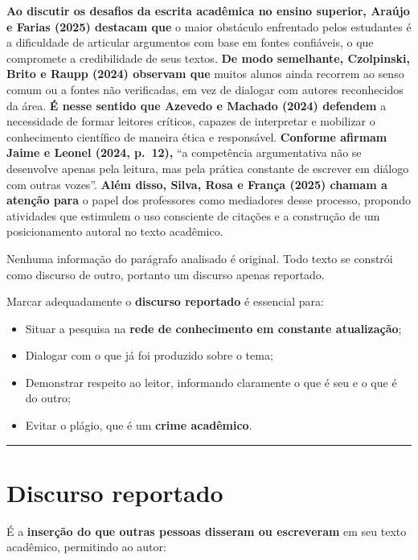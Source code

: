 \documentclass[
  letterpaper,
  DIV=11,
  numbers=noendperiod]{scrreprt}
\providecommand{\tightlist}{%
  \setlength{\itemsep}{0pt}\setlength{\parskip}{0pt}}
\begin{document}
\textbf{Ao discutir os desafios da escrita acadêmica no ensino superior,
Araújo e Farias (2025) destacam que} o maior obstáculo enfrentado pelos
estudantes é a dificuldade de articular argumentos com base em fontes
confiáveis, o que compromete a credibilidade de seus textos. \textbf{De
modo semelhante, Czolpinski, Brito e Raupp (2024) observam que} muitos
alunos ainda recorrem ao senso comum ou a fontes não verificadas, em vez
de dialogar com autores reconhecidos da área. \textbf{É nesse sentido
que Azevedo e Machado (2024) defendem} a necessidade de formar leitores
críticos, capazes de interpretar e mobilizar o conhecimento científico
de maneira ética e responsável. \textbf{Conforme afirmam Jaime e Leonel
(2024, p.~12),} ``a competência argumentativa não se desenvolve apenas
pela leitura, mas pela prática constante de escrever em diálogo com
outras vozes''. \textbf{Além disso, Silva, Rosa e França (2025) chamam a
atenção para} o papel dos professores como mediadores desse processo,
propondo atividades que estimulem o uso consciente de citações e a
construção de um posicionamento autoral no texto acadêmico.

Nenhuma informação do parágrafo analisado é original. Todo texto se
constrói como discurso de outro, portanto um discurso apenas reportado.

Marcar adequadamente o \textbf{discurso reportado} é essencial para:

\begin{itemize}
\tightlist
\item
  Situar a pesquisa na \textbf{rede de conhecimento em constante
  atualização};
\item
  Dialogar com o que já foi produzido sobre o tema;
\item
  Demonstrar respeito ao leitor, informando claramente o que é seu e o
  que é do outro;
\item
  Evitar o plágio, que é um \textbf{crime acadêmico}.
\end{itemize}

\begin{center}\rule{0.5\linewidth}{0.5pt}\end{center}

\section{Discurso reportado}\label{discurso-reportado}

É a \textbf{inserção do que outras pessoas disseram ou escreveram} em
seu texto acadêmico, permitindo ao autor:
\end{document}
